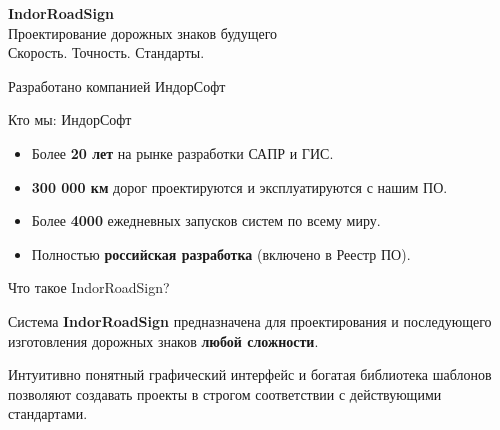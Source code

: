 \documentclass[aspectratio=169]{beamer}
\begin{document}
\begin{frame}
    \begin{center}
        \vspace{1cm}
        \begin{roundbox}
            \begin{center}
                \vspace{0.5cm}
                {\Huge \textcolor{AccentCyan}{\textbf{IndorRoadSign}}}\\[0.5cm]
                {\Large Проектирование дорожных знаков будущего}\\[0.5cm]
                \textcolor{TextHighlight}{Скорость. Точность. Стандарты.}
                \vspace{0.5cm}
            \end{center}
        \end{roundbox}
        \vspace{1cm}
        {\small Разработано компанией \textcolor{AccentCyan}{ИндорСофт}}
    \end{center}
\end{frame}

\begin{frame}{Кто мы: ИндорСофт}
    \begin{roundbox}
        \begin{itemize}
            \item Более \textcolor{AccentCyan}{\textbf{20 лет}} на рынке разработки САПР и ГИС.
            \item \textcolor{AccentCyan}{\textbf{300 000 км}} дорог проектируются и эксплуатируются с нашим ПО.
            \item Более \textcolor{AccentCyan}{\textbf{4000}} ежедневных запусков систем по всему миру.
            \item Полностью \textcolor{TextHighlight}{\textbf{российская разработка}} (включено в Реестр ПО).
        \end{itemize}
    \end{roundbox}
\end{frame}

\begin{frame}{Что такое IndorRoadSign?}
    \begin{simplebox}
        Система \textcolor{AccentCyan}{\textbf{IndorRoadSign}} предназначена для проектирования и последующего изготовления дорожных знаков \textcolor{TextHighlight}{\textbf{любой сложности}}.
        \vspace{0.5cm}
        
        Интуитивно понятный графический интерфейс и богатая библиотека шаблонов позволяют создавать проекты в строгом соответствии с действующими стандартами.
    \end{simplebox}
\end{frame}
\end{document}
